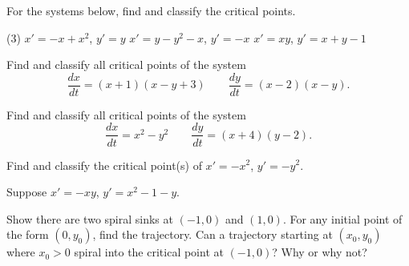 \documentclass{ximera}
\begin{document}
\begin{exercise}%
    For the systems below, find and classify the critical points.
    \begin{tasks}(3)
        \task $x'=-x+x^2$, $y'=y$
        \task $x'=y-y^2-x$, $y'=-x$
        \task $x'=xy$, $y'=x+y-1$
    \end{tasks}
\end{exercise}

\begin{exercise}
    Find and classify all critical points of the system
    \[ 
        \frac{dx}{dt} = (x+1)(x-y+3) \qquad \frac{dy}{dt} = (x-2)(x-y) .
    \]
\end{exercise}

\begin{exercise}
    Find and classify all critical points of the system
    \[ 
        \frac{dx}{dt} = x^2 - y^2 \qquad \frac{dy}{dt} = (x+4)(y-2) .
    \]
\end{exercise}


\begin{exercise}
    Find and classify the critical point(s) of $x' = -x^2$, $y' = -y^2$.
\end{exercise}


\begin{exercise}
    Suppose $x'=-xy$, $y'=x^2-1-y$.
    \begin{tasks}
        \task Show there are two spiral sinks at $(-1,0)$ and $(1,0)$.
        \task For any initial point of the form $(0,y_0)$, find the trajectory.
        \task Can a trajectory starting at $(x_0,y_0)$ where $x_0 > 0$ spiral into the critical point at $(-1,0)$?  Why or why not?
    \end{tasks}
\end{exercise}


\end{document}
